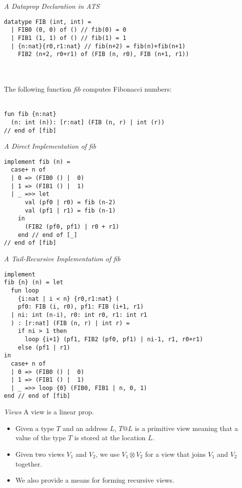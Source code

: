\documentclass[pdf]{prosper}
\begin{document}
\begin{slide}{\em A Dataprop Declaration in ATS}
{\blue\begin{verbatim}
datatype FIB (int, int) =
  | FIB0 (0, 0) of () // fib(0) = 0
  | FIB1 (1, 1) of () // fib(1) = 1
  | {n:nat}{r0,r1:nat} // fib(n+2) = fib(n)+fib(n+1)
    FIB2 (n+2, r0+r1) of (FIB (n, r0), FIB (n+1, r1))
\end{verbatim}
}~\\~\\
The following function {\it fib} computes Fibonacci numbers:\\~\\
{\blue\begin{verbatim}
fun fib {n:nat}
  (n: int (n)): [r:nat] (FIB (n, r) | int (r))
// end of [fib]
\end{verbatim}
}
\vfill
\end{slide}
\begin{slide}{\em A Direct Implementation of {\it fib}}
{\blue\begin{verbatim}
implement fib (n) =
  case+ n of
  | 0 => (FIB0 () |  0)
  | 1 => (FIB1 () |  1)
  | _ =>> let
      val (pf0 | r0) = fib (n-2)
      val (pf1 | r1) = fib (n-1)
    in
      (FIB2 (pf0, pf1) | r0 + r1)
    end // end of [_]
// end of [fib]
\end{verbatim}
}
\end{slide}
\begin{slide}{\em A Tail-Recursive Implementation of {\it fib}}
{
\fontsize{10}{10}
\blue\begin{verbatim}
implement
fib {n} (n) = let
  fun loop
    {i:nat | i < n} {r0,r1:nat} (
    pf0: FIB (i, r0), pf1: FIB (i+1, r1)
  | ni: int (n-i), r0: int r0, r1: int r1
  ) : [r:nat] (FIB (n, r) | int r) =
    if ni > 1 then
      loop {i+1} (pf1, FIB2 (pf0, pf1) | ni-1, r1, r0+r1)
    else (pf1 | r1)
in
  case+ n of
  | 0 => (FIB0 () |  0)
  | 1 => (FIB1 () |  1)
  | _ =>> loop {0} (FIB0, FIB1 | n, 0, 1)
end // end of [fib]
\end{verbatim}
}
\end{slide}
\begin{slide}{\em Views}
A view is a linear prop.
\begin{itemize}
\item
Given a type $T$ and an address $L$, $T@L$ is a primitive view
meaning that a value of the type $T$ is stored at the location $L$.
\item
Given two views $V_1$ and $V_2$, we use $V_1\otimes V_2$ for a
view that joins $V_1$ and $V_2$ together.
\item
We also provide a means for forming recursive views. 
\end{itemize}
\end{slide}
\end{document}
